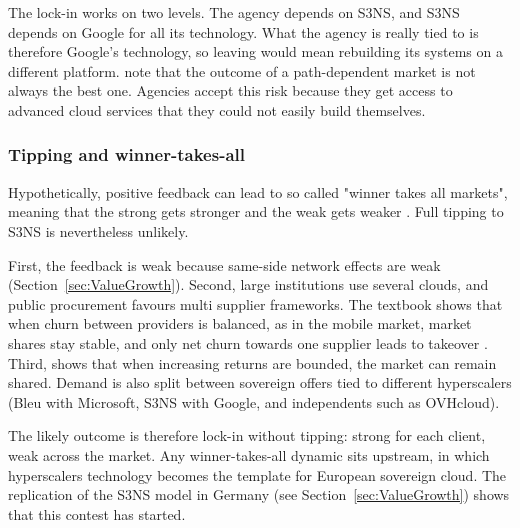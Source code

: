 The lock-in works on two levels. The agency depends on S3NS, and S3NS depends on Google for all its technology. What the agency is really tied to is therefore Google's technology, so leaving would mean rebuilding its systems on a different platform. \textcite{overby2021} note that the outcome of a path-dependent market is not always the best one. Agencies accept this risk because they get access to advanced cloud services that they could not easily build themselves. 


\subsubsection{Tipping and winner-takes-all}
\label{sec:Tipping}

Hypothetically, positive feedback can lead to so called "winner takes all markets", meaning that the strong gets stronger and the weak gets weaker \parencite[pp.~130, 168]{overby2021}. Full tipping to S3NS is nevertheless unlikely. 

First, the feedback is weak because same-side network effects are weak (Section~\ref{sec:ValueGrowth}). Second, large institutions use several clouds, and public procurement favours multi supplier frameworks. The textbook shows that when churn between providers is balanced, as in the mobile market, market shares stay stable, and only net churn towards one supplier leads to takeover \parencite[pp.~169--170]{overby2021}. Third, \textcite[pp.~125--126]{arthur1989} shows that when increasing returns are bounded, the market can remain shared. Demand is also split between sovereign offers tied to different hyperscalers (Bleu with Microsoft, S3NS with Google, and independents such as OVHcloud).

The likely outcome is therefore lock-in without tipping: strong for each client, weak across the market. Any winner-takes-all dynamic sits upstream, in which hyperscalers technology becomes the template for European sovereign cloud. The replication of the S3NS model in Germany (see Section~\ref{sec:ValueGrowth}) shows that this contest has started.

